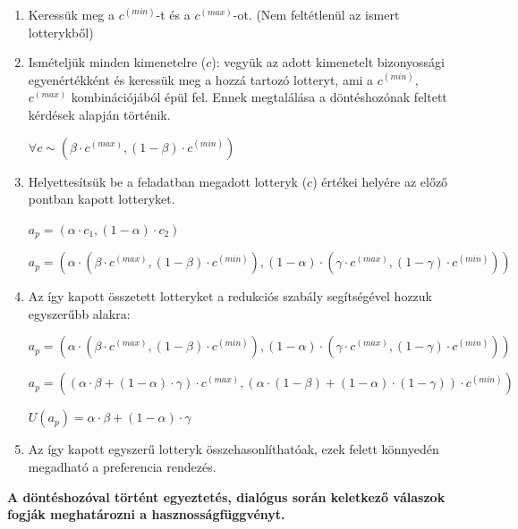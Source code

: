\documentclass[a4paper,12pt]{article}
\begin{document}
\begin{enumerate}
\item Keressük meg a $c^{(min)}$-t és a $c^{(max)}$-ot. (Nem feltétlenül az ismert lotterykből)
\item Ismételjük minden kimenetelre ($c$): vegyük az adott kimenetelt bizonyossági egyenértékként és keressük meg a hozzá tartozó lotteryt, ami a $c^{(min)}$, $c^{(max)}$ kombinációjából épül fel. Ennek megtalálása a döntéshozónak feltett kérdések alapján történik.  

$\forall c \sim  (\beta \cdot c^{(max)},(1-\beta)\cdot c^{(min)})$
\item Helyettesítsük be a feladatban megadott lotteryk ($c$) értékei helyére az előző pontban kapott lotteryket. 

$a_p = (\alpha \cdot c_1, (1-\alpha) \cdot c_2 ) $

$a_p = (\alpha\cdot(\beta \cdot c^{(max)},(1-\beta)\cdot c^{(min)}), (1-\alpha) \cdot(\gamma\cdot c^{(max)},(1-\gamma)\cdot c^{(min)})) $

\item Az így kapott összetett lotteryket a redukciós szabály segítségével hozzuk egyszerűbb alakra: 

$a_p = (\alpha\cdot(\beta \cdot c^{(max)},(1-\beta)\cdot c^{(min)}), (1-\alpha) \cdot(\gamma\cdot c^{(max)},(1-\gamma)\cdot c^{(min)}) )$

$a_p = ((\alpha \cdot \beta + (1-\alpha) \cdot \gamma) \cdot c^{(max)} , (\alpha \cdot (1-\beta) + (1-\alpha) \cdot (1-\gamma) ) \cdot c^{(min)} ) $

$U(a_p) = \alpha \cdot \beta + (1-\alpha) \cdot \gamma$


\item Az így kapott egyszerű lotteryk összehasonlíthatóak, ezek felett könnyedén megadható a preferencia rendezés.
\end{enumerate}

\textbf{A döntéshozóval történt egyeztetés, dialógus során keletkező válaszok fogják meghatározni a hasznosságfüggvényt.}
\end{document}
